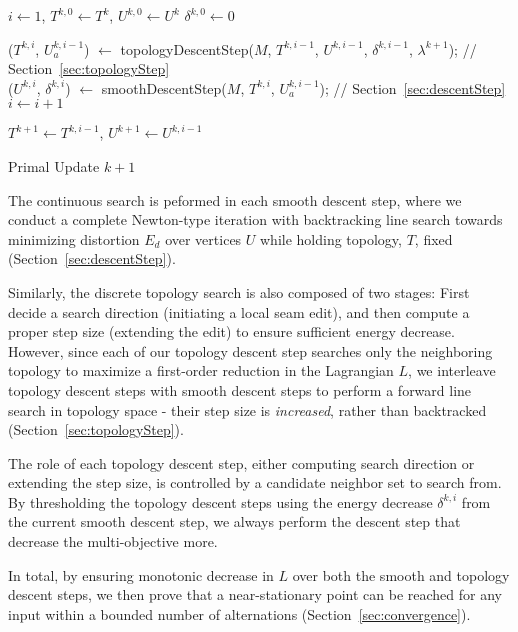 \begin{algorithm}[h]
\SetAlgoLined
{}
$i \leftarrow 1$, $T^{k,0} \leftarrow T^{k}$, $U^{k,0} \leftarrow U^{k}$\;
$\delta^{k,0} \leftarrow 0$\;
{
	
	($T^{k,i}$, $U_a^{k,i-1}$) $\leftarrow$ topologyDescentStep($M$, $T^{k,i-1}$, $U^{k,i-1}$, $\delta^{k,i-1}$, $\lambda^{k+1}$); // Section~\ref{sec:topologyStep}\\
	($U^{k,i}$, $\delta^{k,i}$) $\leftarrow$ smoothDescentStep($M$, $T^{k,i}$, $U_a^{k,i-1}$); // Section~\ref{sec:descentStep}\\
	$i \leftarrow i+1$\;
}
$T^{k+1} \leftarrow T^{k,i-1}$, $U^{k+1} \leftarrow U^{k,i-1}$
\caption{Primal Update $k+1$}
\label{alg:DCSearch}
\end{algorithm}

The continuous search is peformed in each smooth descent step, where we conduct a complete Newton-type iteration with backtracking line search towards minimizing distortion $E_d$ over vertices $U$ while holding topology, $T$, fixed (Section~\ref{sec:descentStep}).

Similarly, the discrete topology search is also composed of two stages: First decide a search direction (initiating a local seam edit), and then compute a proper step size (extending the edit) to ensure sufficient energy decrease. However, since each of our topology descent step searches only the neighboring topology to maximize a first-order reduction in the Lagrangian $L$, we interleave topology descent steps with smooth descent steps to perform a forward line search in topology space - their step size is \emph{increased}, rather than backtracked (Section~\ref{sec:topologyStep}).

The role of each topology descent step, either computing search direction or extending the step size, is controlled by a candidate neighbor set to search from. By thresholding the topology descent steps using the energy decrease $\delta^{k,i}$ from the current smooth descent step, we always perform the descent step that decrease the multi-objective more.

In total, by ensuring monotonic decrease in $L$ over both the smooth and topology descent steps, we then prove that a near-stationary point can be reached for any input within a bounded number of alternations (Section~\ref{sec:convergence}). 

